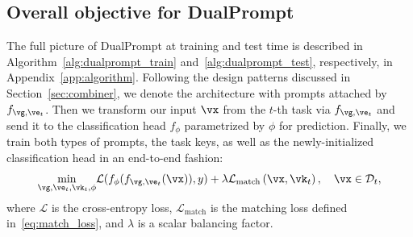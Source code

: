 \documentclass[runningheads]{llncs}
\newcommand{\sayna}[1]{\textcolor{blue}{Sayna: #1}}
\newcommand{\zifeng}[1]{\textcolor{red}{Zifeng: #1}}
\newcommand{\method}{DualPrompt\xspace}
\newcommand{\eprompt}{E-Prompt\xspace}
\begin{document}
\subsection{Overall objective for \method} \label{sec:main_obj}
The full picture of \method at training and test time is described in Algorithm~\ref{alg:dualprompt_train} and~\ref{alg:dualprompt_test}, respectively, in Appendix~\ref{app:algorithm}. Following the design patterns discussed in Section~\ref{sec:combiner}, we denote the architecture with prompts attached by $f_{\vg, \ve_t}$. Then we transform our input $\vx$ from the $t$-th task via $f_{\vg, \ve_t}$ and send it to the classification head $f_\phi$ parametrized by $\phi$ for prediction. Finally, we train both types of prompts, the task keys, as well as the newly-initialized classification head in an end-to-end fashion:
\begin{equation} \label{eq:full_loss}
    \underset{\vg, \ve_t, \vk_t, \phi}{\operatorname{min}}  \mathcal{L}(f_\phi(f_{\vg, \ve_t}(\vx)), y) + \lambda \mathcal{L}_{\text{match}} \left(\vx, \vk_t \right), \quad \vx \in \mathcal{D}_t,
\end{equation}
where $\mathcal{L}$ is the cross-entropy loss, $\mathcal{L}_{\text{match}}$ is the matching loss defined in~\eqref{eq:match_loss}, and $\lambda$ is a scalar balancing factor. 

\end{document}
